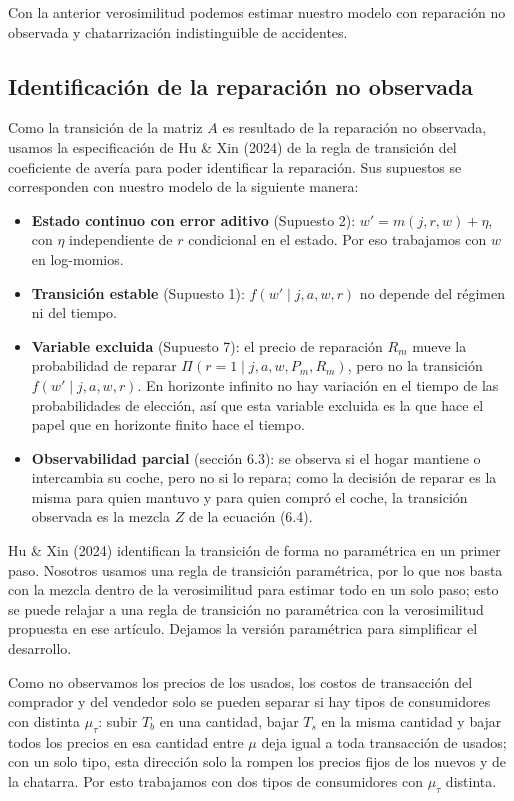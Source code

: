 \documentclass{article}
\begin{document}
Con la anterior verosimilitud podemos estimar nuestro modelo con reparación no observada y chatarrización indistinguible de accidentes.

\subsection{Identificación de la reparación no observada}

Como la transición de la matriz $A$ es resultado de la reparación no observada, usamos la especificación de Hu \& Xin (2024) de la regla de transición del coeficiente de avería para poder identificar la reparación. Sus supuestos se corresponden con nuestro modelo de la siguiente manera:
\begin{itemize}
    \item \textbf{Estado continuo con error aditivo} (Supuesto 2): $w'=m(j,r,w)+\eta$, con $\eta$ independiente de $r$ condicional en el estado. Por eso trabajamos con $w$ en log-momios.
    \item \textbf{Transición estable} (Supuesto 1): $f(w'\mid j,a,w,r)$ no depende del régimen ni del tiempo.
    \item \textbf{Variable excluida} (Supuesto 7): el precio de reparación $R_m$ mueve la probabilidad de reparar $\Pi(r=1\mid j,a,w,P_m,R_m)$, pero no la transición $f(w'\mid j,a,w,r)$. En horizonte infinito no hay variación en el tiempo de las probabilidades de elección, así que esta variable excluida es la que hace el papel que en horizonte finito hace el tiempo.
    \item \textbf{Observabilidad parcial} (sección 6.3): se observa si el hogar mantiene o intercambia su coche, pero no si lo repara; como la decisión de reparar es la misma para quien mantuvo y para quien compró el coche, la transición observada es la mezcla $Z$ de la ecuación (6.4).
\end{itemize}


Hu \& Xin (2024) identifican la transición de forma no paramétrica en un primer paso. Nosotros usamos una regla de transición paramétrica, por lo que nos basta con la mezcla dentro de la verosimilitud para estimar todo en un solo paso; esto se puede relajar a una regla de transición no paramétrica con la verosimilitud propuesta en ese artículo. Dejamos la versión paramétrica para simplificar el desarrollo.

Como no observamos los precios de los usados, los costos de transacción del comprador y del vendedor solo se pueden separar si hay tipos de consumidores con distinta $\mu_\tau$: subir $T_b$ en una cantidad, bajar $T_s$ en la misma cantidad y bajar todos los precios en esa cantidad entre $\mu$ deja igual a toda transacción de usados; con un solo tipo, esta dirección solo la rompen los precios fijos de los nuevos y de la chatarra. Por esto trabajamos con dos tipos de consumidores con $\mu_\tau$ distinta.
\end{document}
